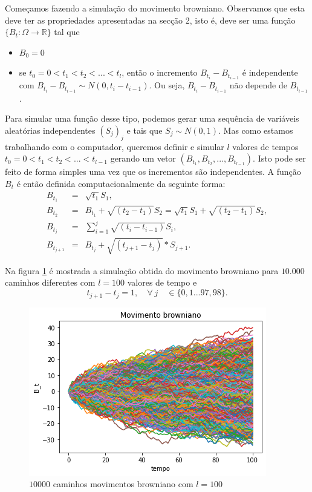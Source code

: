 \documentclass[12pt]{article}
\newcommand{\mr }{ \mathbb{R}}
\begin{document}
Começamos fazendo a simulação do movimento browniano. Observamos que esta deve ter as propriedades apresentadas na secção 2, isto é,  deve ser uma função $\{B_t: \Omega\rightarrow \mr\}$ tal que \begin{itemize}
\item $B_0=0$ 
\item se $t_0 = 0 < t_1 < t_2<...<t_l$, então o incremento $B_{t_i} - B_{t_{i-1}}$ é independente com $B_{t_i} - B_{t_{i-1}} \sim N(0,t_i-t_{i-1})$. Ou seja, $B_{t_i} - B_{t_{i-1}}$ não depende de $B_{t_{i-1}}$.
\end{itemize}
Para  simular uma função desse tipo, podemos gerar uma sequência de  variáveis aleatórias independentes $(S_j)_j$ e tais que $S_j \sim N(0,1)$. Mas como estamos trabalhando com o computador, queremos definir e simular $l$ valores de tempos  $t_0 = 0 < t_1 < t_2<...<t_{l-1}$ gerando um vetor $(B_{t_1},B_{t_2},...,B_{t_{l-1}})$. Isto pode ser feito de forma simples uma vez que os incrementos são independentes. A função $B_t$ é então  definida computacionalmente da seguinte forma:
\begin{eqnarray*}
 B_{t_1} &=& \sqrt{t_1}S_1,\\
 B_{t_2} &=& B_{t_1} + \sqrt{(t_2 - t_1)}S_2 = \sqrt{t_1}S_1 + \sqrt{(t_2 - t_1)}S_2,\\
 B_{t_j} &=& \sum_{i=1}^j \sqrt{(t_i-t_{i-1})}S_i,\\
 B_{t_{j+1}} &=& B_{t_j} + \sqrt{(t_{j+1}-t_j)}*S_{j+1}.
\end{eqnarray*}


Na figura  \ref{fig:bm} é mostrada a simulação obtida do movimento browniano para  $10.000$ caminhos diferentes com $l=100$ valores de tempo e 
\[t_{j+1} - t_{j} = 1,  \quad \forall~j \quad \in \{0,1...97,98\}.\] 

\begin{figure}[H]
 \centering
 \includegraphics[width=1.0\linewidth]{bm.png}
 \caption{$10000$ caminhos movimentos browniano com $l=100$}
 \label{fig:bm}
\end{figure}
 
\end{document}
